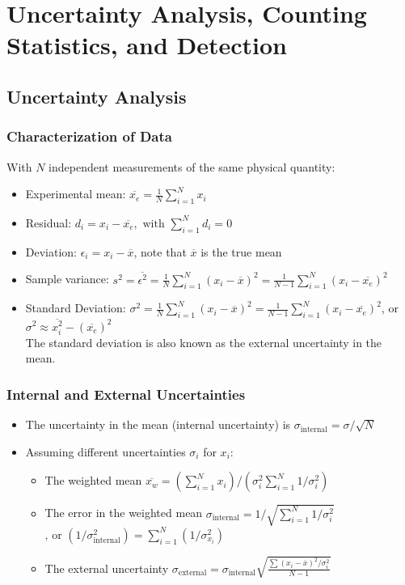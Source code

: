 \section{Uncertainty Analysis, Counting Statistics, and Detection}
\subsection{Uncertainty Analysis}
\subsubsection{Characterization of Data}
With $N$ independent measurements of the same physical quantity:
\begin{itemize}
    \item Experimental mean: $\overline{x_e}=\frac{1}{N}\sum_{i=1}^Nx_i$
    \item Residual: $d_i=x_i-\overline{x_e},\text{ with }\sum_{i=1}^Nd_i=0$
    \item Deviation: $\epsilon_i=x_i-\overline{x}$, note that $\overline{x}$ is the true mean 
    \item Sample variance: $s^2=\overline{\epsilon^2}=\frac{1}{N}\sum_{i=1}^N(x_i-\overline{x})^2=\frac{1}{N-1}\sum_{i=1}^N(x_i-\overline{x_e})^2$
    \item Standard Deviation: $\sigma^2=\frac{1}{N}\sum_{i=1}^N(x_i-\overline{x})^2=\frac{1}{N-1}\sum_{i=1}^N(x_i-\overline{x_e})^2$, or $\sigma^2\approx\overline{x_i^2}-(\overline{x_e})^2$\\
    The standard deviation is also known as the external uncertainty in the mean.
\end{itemize}
\subsubsection{Internal and External Uncertainties}
\begin{itemize}
    \item The uncertainty in the mean (internal uncertainty) is $\sigma_{\text{internal}}=\sigma/\sqrt{N}$
    \item Assuming different uncertainties $\sigma_i$ for $x_i$:
    \begin{itemize}
        \item The weighted mean $\overline{x_w}=\left(\sum_{i=1}^Nx_i\right)/\left(\sigma_i^2\sum_{i=1}^N1/\sigma_i^2\right)$
        \item The error in the weighted mean $\sigma_{\text{internal}}=1/\sqrt{\sum_{i=1}^N1/\sigma_i^2}$\\, or $\left(1/\sigma_\text{internal}^2\right)=\sum_{i=1}^N\left(1/\sigma_{x_i}^2\right)$
        \item The external uncertainty $\sigma_\text{external}=\sigma_\text{internal}\sqrt{\frac{\sum(x_i-\overline{x})^2/\sigma_i^2}{N-1}}$
    \end{itemize}
    
\end{itemize}
